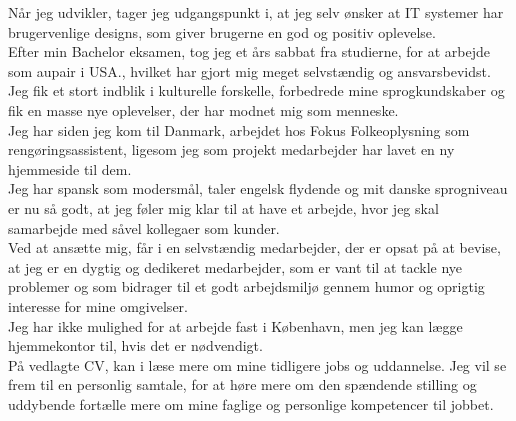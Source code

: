 \documentclass[11pt,a4paper,sans]{moderncv}        %
\begin{document}
Når jeg udvikler, tager jeg udgangspunkt i, at jeg selv ønsker at IT systemer har brugervenlige designs, som giver brugerne en god og positiv oplevelse.\\

Efter min Bachelor eksamen, tog jeg et års sabbat fra studierne, for at arbejde som aupair i USA., hvilket har gjort mig meget selvstændig og ansvarsbevidst. Jeg fik et stort indblik i kulturelle forskelle, forbedrede mine sprogkundskaber og fik en masse nye oplevelser, der har modnet mig som menneske.\\

Jeg har siden jeg kom til Danmark, arbejdet hos Fokus Folkeoplysning som rengøringsassistent, ligesom jeg som projekt medarbejder har lavet en ny hjemmeside til dem.\\

Jeg har spansk som modersmål, taler engelsk flydende og mit danske sprogniveau er nu så godt, at jeg føler mig klar til at have et arbejde, hvor jeg skal samarbejde med såvel kollegaer som kunder.\\

Ved at ansætte mig, får i en selvstændig medarbejder, der er opsat på at bevise, at jeg er en dygtig og dedikeret medarbejder, som er vant til at tackle nye problemer og som bidrager til et godt arbejdsmiljø gennem humor og oprigtig interesse for mine omgivelser.\\

Jeg har ikke mulighed for at arbejde fast i København, men jeg kan lægge hjemmekontor til, hvis det er nødvendigt.\\

På vedlagte CV, kan i læse mere om mine tidligere jobs og uddannelse. Jeg vil se frem til en personlig samtale, for at høre mere om den spændende stilling og uddybende fortælle mere om mine faglige og personlige kompetencer til jobbet.
\fi

\makeletterclosing

\end{document}
